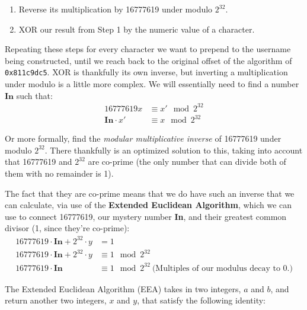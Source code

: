 \documentclass[14pt,a4paper,notitlepage]{extarticle}
\begin{document}
                \begin{enumerate}
                    \item Reverse its multiplication by 16777619 under modulo $2^{32}$.
                    \item XOR our result from Step 1 by the numeric value of a character.
                \end{enumerate}

                Repeating these steps for every character we want to prepend to the
                username being constructed, until we reach back to the original offset
                of the algorithm of \texttt{0x811c9dc5}.
                XOR is thankfully its own inverse, but
                inverting a multiplication under modulo is a little more complex.
                We will essentially need to find a number $\mathbf{In}$ such that:
                \begin{align*}
                    16777619x &\equiv x' \mod 2^{32}\\
                    \mathbf{In} \cdot x' &\equiv x \mod 2^{32}
                \end{align*}

                Or more formally, find the \textit{modular multiplicative inverse} of
                16777619 under modulo $2^{32}$. There thankfully is an optimized solution
                to this, taking into account that 16777619 and $2^{32}$ are co-prime
                (the only number that can divide both of them with no remainder is 1).

                The fact that they are co-prime means that we do have such an inverse
                that we can calculate, via use of the \textbf{Extended Euclidean Algorithm},
                which we can use to connect 16777619, our mystery number \textbf{In}, and
                their greatest common divisor (1, since they're co-prime):
                \begin{align*}
                    16777619 \cdot \mathbf{In} + 2^{32} \cdot y &= 1\\
                    16777619 \cdot \mathbf{In} + 2^{32} \cdot y &\equiv 1 \mod 2^{32}\\
                    16777619 \cdot \mathbf{In} &\equiv 1 \mod 2^{32}\ \text{(Multiples of our modulus decay to 0.)}
                \end{align*}

                The Extended Euclidean Algorithm (EEA) takes in two integers, $a$ and $b$, and return
                another two integers, $x$ and $y$, that satisfy the following identity:
\end{document}
